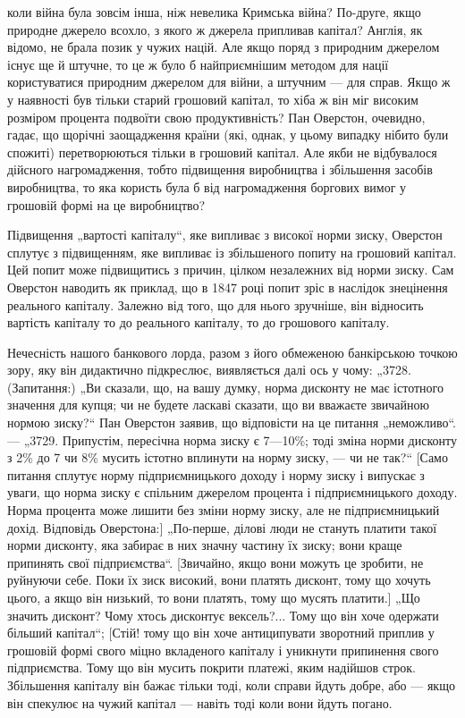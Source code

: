 коли війна була зовсім інша, ніж невелика Кримська війна? По-друге, якщо природне джерело всохло, з
якого ж джерела припливав капітал? Англія, як відомо, не брала позик у чужих націй.
Але якщо поряд з природним джерелом існує ще й штучне, то
це ж було б найприємнішим методом для нації користуватися
природним джерелом для війни, а штучним — для справ. Якщо ж
у наявності був тільки старий грошовий капітал, то хіба ж
він міг високим розміром процента подвоїти свою продуктивність?
Пан Оверстон, очевидно, гадає, що щорічні заощадження країни
(які, однак, у цьому випадку нібито були спожиті) перетворюються тільки в грошовий капітал. Але якби
не відбувалося
дійсного нагромадження, тобто підвищення виробництва і збільшення засобів виробництва, то яка
користь була б від нагромадження боргових вимог у грошовій формі на це виробництво?

Підвищення „вартості капіталу“, яке випливає з високої
норми зиску, Оверстон сплутує з підвищенням, яке випливає
із збільшеного попиту на грошовий капітал. Цей попит може
підвищитись з причин, цілком незалежних від норми зиску. Сам
Оверстон наводить як приклад, що в 1847 році попит зріс в наслідок знецінення реального капіталу.
Залежно від того, що для
нього зручніше, він відносить вартість капіталу то до реального
капіталу, то до грошового капіталу.

Нечесність нашого банкового лорда, разом з його обмеженою
банкірською точкою зору, яку він дидактично підкреслює, виявляється далі ось у чому: „3728.
(Запитання:) „Ви сказали, що,
на вашу думку, норма дисконту не має істотного значення для
купця; чи не будете ласкаві сказати, що ви вважаєте звичайною нормою зиску?“ Пан Оверстон заявив, що
відповісти на це
питання „неможливо“. — „3729. Припустім, пересічна норма
зиску є 7—10\%; тоді зміна норми дисконту з 2\% до 7 чи 8\%
мусить істотно вплинути на норму зиску, — чи не так?“ [Само
питання сплутує норму підприємницького доходу і норму зиску
і випускає з уваги, що норма зиску є спільним джерелом процента
і підприємницького доходу. Норма процента може лишити без
зміни норму зиску, але не підприємницький дохід. Відповідь Оверстона:] „По-перше, ділові люди не
стануть платити такої норми
дисконту, яка забирає в них значну частину їх зиску; вони краще
припинять свої підприємства“. [Звичайно, якщо вони можуть це
зробити, не руйнуючи себе. Поки їх зиск високий, вони платять
дисконт, тому що хочуть цього, а якщо він низький, то вони платять,
тому що мусять платити.] „Що значить дисконт? Чому хтось
дисконтує вексель?... Тому що він хоче одержати більший капітал“; [Стій! тому що він хоче
антиципувати зворотний приплив у грошовій формі свого міцно вкладеного капіталу і
уникнути припинення свого підприємства. Тому що він мусить
покрити платежі, яким надійшов строк. Збільшення капіталу він
бажає тільки тоді, коли справи йдуть добре, або — якщо він спекулює на чужий капітал — навіть тоді
коли вони йдуть погано.
